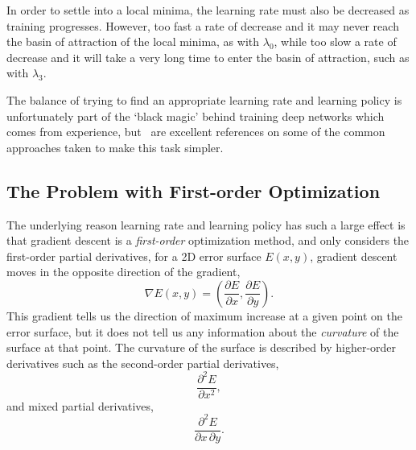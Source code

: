 \documentclass[thesis]{subfiles}
\begin{document}
In order to settle into a local minima, the learning rate must also be decreased as training progresses. However, too fast a rate of decrease and it may never reach the basin of attraction of the local minima, as with $\lambda_0$, while too slow a rate of decrease and it will take a very long time to enter the basin of attraction, such as with $\lambda_3$. 

The balance of trying to find an appropriate learning rate and learning policy is unfortunately part of the `black magic' behind training deep networks which comes from experience, but~\citep{Bottou2012sgdtricks, goodfellow2016deep} are excellent references on some of the common approaches taken to make this task simpler.

\subsection{The Problem with First-order Optimization}
The underlying reason learning rate and learning policy has such a large effect is that gradient descent is a \emph{first-order} optimization method, and only considers the first-order partial derivatives, \ie for a 2D error surface $E(x, y)$, gradient descent moves in the opposite direction of the gradient,
\begin{equation}
    \nabla E(x, y) = {\left(\frac{\partial E}{\partial x}, \frac{\partial E}{\partial y}\right)}.
\end{equation}
This gradient tells us the direction of maximum increase at a given point on the error surface, but it does not tell us any information about the \emph{curvature} of the surface at that point. The curvature of the surface is described by higher-order derivatives such as the second-order partial derivatives, \eg
\begin{equation}
    \frac{\partial^2 E}{\partial x^2},
\end{equation}
and mixed partial derivatives, \eg
\begin{equation}
    \frac{\partial^2 E}{\partial x\,\partial y}.
\end{equation}
%
\end{document}
